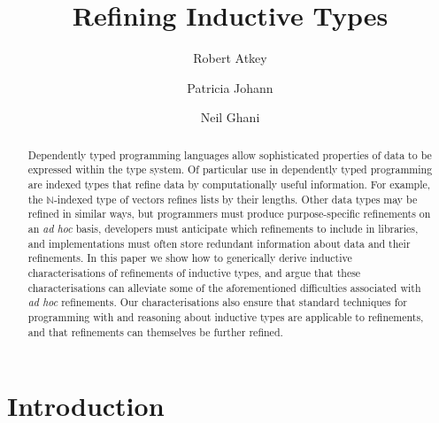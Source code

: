 \documentclass{LMCS}
\begin{document}
\title[Refining Inductive Types]{Refining Inductive Types}

\author[R.~Atkey]{Robert Atkey}
\address{University of Strathclyde, UK}

\author[P.~Johann]{Patricia Johann}


\author[N.~Ghani]{Neil Ghani}



\begin{abstract}
  Dependently typed programming languages allow sophisticated
  properties of data to be expressed within the type system. Of
  particular use in dependently typed programming are indexed types
  that refine data by computationally useful information.  For
  example, the $\mathbb{N}$-indexed type of vectors refines lists by
  their lengths. Other data types may be refined in similar ways, but
  programmers must produce purpose-specific refinements on an {\em ad
    hoc} basis, developers must anticipate which refinements to
  include in libraries, and implementations must often store redundant
  information about data and their refinements. In this paper we show
  how to generically derive inductive characterisations of refinements
  of inductive types, and argue that these characterisations can
  alleviate some of the aforementioned difficulties associated with
  {\em ad hoc} refinements. Our characterisations also ensure that
  standard techniques for programming with and reasoning about
  inductive types are applicable to refinements, and that refinements
  can themselves be further refined.
\end{abstract}

\maketitle

\section{Introduction}\label{sec:introduction}
\end{document}
